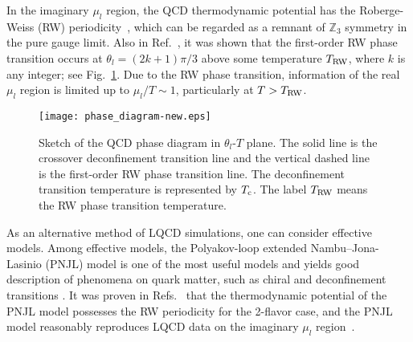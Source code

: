 \documentclass[prd,superscriptaddress,unsortedaddress,
twocolumn,showpacs,preprintnumbers,amsmath,amssymb]{revtex4}
\begin{document}
In the imaginary $\mu_{l}$ region,
the QCD thermodynamic potential has
the Roberge-Weiss (RW) periodicity~\cite{bib_Roberge-Weiss},
which can be regarded as a
remnant of $\mathbb{Z}_{3}$ symmetry in the pure gauge limit.
Also in Ref.~\cite{bib_Roberge-Weiss},
it was shown that
the first-order RW phase transition occurs at $\theta_{l}=(2k+1)\pi/3$
above some temperature $T_{\rm RW}$,
where $k$ is any integer; see Fig.~\ref{phase_diagram_sketch}.
Due to the RW phase transition,
information of the real $\mu_{l}$ region is limited up to $\mu_{l}/T\sim 1$,
particularly at $T>T_{\rm RW}$.

 \begin{figure}[]
  \begin{center}
\texttt{[image: phase\_diagram-new.eps]}
\end{center}
\caption{
  Sketch of the QCD phase diagram in $\theta_{l}$-$T$ plane.
  The solid line is the crossover deconfinement transition line and
  the vertical dashed line is the first-order RW phase transition line.
  The deconfinement transition temperature is represented by $T_{\rm c}$.
  The label $T_{\rm RW}$ means the RW phase transition temperature.
}
\label{phase_diagram_sketch}
 \end{figure}

As an alternative method of LQCD simulations,
one can consider effective models.
Among effective models,
the Polyakov-loop extended Nambu--Jona-Lasinio (PNJL) model
is one of the most useful models
and yields good description of phenomena on quark matter,
such as chiral and deconfinement transitions
\cite{Meisinger, Dumitru, Fukushima1, Ghos, Megias, Ratti1, Rossner,
Kashiwa_PNJL, Sakai_PRD77_051901,
Sakai_PRD78_036001, Sakai_PRD78_076007, Sakai_PRD79_096001, Sakai_JPhys}.
It was proven in Refs.~\cite{Sakai_PRD77_051901,
Sakai_PRD78_036001, Sakai_PRD78_076007, Sakai_PRD79_096001}
that the thermodynamic potential of the PNJL model
possesses the RW periodicity for the 2-flavor case,
and the PNJL  model reasonably 
reproduces LQCD data on 
the imaginary $\mu_l$ region~\cite{Sakai_PRD79_096001, Sakai_JPhys}.  
\end{document}
